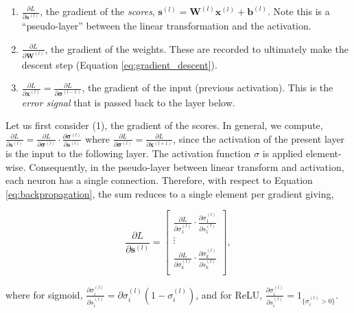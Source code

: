 \begin{enumerate}
\item $\frac{\partial L}{\partial \mathbf{s}^{(l)}}$, the gradient of the \emph{scores}, $\mathbf{s}^{(l)} = \mathbf{W}^{(l)}\mathbf{x}^{(l)} + \mathbf{b}^{(l)}$. Note this is a ``pseudo-layer'' between the linear transformation and the activation.
\item $\frac{\partial L}{\partial \mathbf{W}^{(l)}}$, the gradient of the weights. These are recorded to ultimately make the descent step (Equation \ref{eq:gradient_descent}).
\item $\frac{\partial L}{\partial \mathbf{x}^{(l)}} = \frac{\partial L}{\partial \mathbf{\sigma}^{(l-1)}}$, the gradient of the input (previous activation). This is the \emph{error signal} that is passed back to the layer below.
\end{enumerate}

Let us first consider (1), the gradient of the scores. In general, we compute, $\frac{\partial L}{\partial \mathbf{s}^{(l)}} = \frac{\partial L}{\partial \boldsymbol\sigma^{(l)}}\cdot\frac{\partial\boldsymbol\sigma^{(l)}}{\partial\mathbf{s}^{(l)}}$ where $\frac{\partial L}{\partial \boldsymbol\sigma^{(l)}} = \frac{\partial L}{\partial \mathbf{x}^{(l+1)}}$, since the activation of the present layer is the input to the following layer. The activation function $\sigma$ is applied element-wise. Consequently, in the pseudo-layer between linear transform and activation, each neuron has a single connection. Therefore, with respect to Equation \ref{eq:backpropagation}, the sum reduces to a single element per gradient giving,


\begin{equation}
\frac{\partial L}{\partial \mathbf{s}^{(l)}} =
\begin{bmatrix}
\frac{\partial L}{\partial\sigma_1^{(l)}}\cdot\frac{\partial\sigma_1^{(l)}}{\partial{s}_1^{(l)}} \\ 
\vdots \\
\frac{\partial L}{\partial\sigma_k^{(l)}}\cdot\frac{\partial\sigma_k^{(l)}}{\partial{s}_k^{(l)}} \\
\end{bmatrix},
\label{eq:backprop_scores}
\end{equation}

where for sigmoid, $\frac{\partial\sigma_i^{(l)}}{\partial{s}_i^{(l)}} = \partial\sigma_i^{(l)}(1 - \sigma_i^{(l)})$, and for ReLU, $\frac{\partial\sigma_i^{(l)}}{\partial{s}_i^{(l)}} = 1_{\{\sigma_i^{(l)} > 0\}}$.

